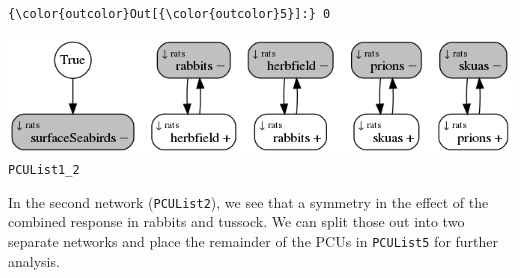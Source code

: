 \documentclass[11pt]{article}
\makeatletter
\def\maxwidth{\ifdim\Gin@nat@width>\linewidth\linewidth
    \else\Gin@nat@width\fi}
\let\Oldincludegraphics\includegraphics
\renewcommand{\includegraphics}[1]{\Oldincludegraphics[width=.8\maxwidth]{#1}}
\makeatother
\begin{document}
\begin{Verbatim}[commandchars=\\\{\}]
{\color{outcolor}Out[{\color{outcolor}5}]:} 0
\end{Verbatim}
            
    \includegraphics{PCUList1_2.png} \texttt{PCUList1\_2}

    In the second network (\texttt{PCUList2}), we see that a symmetry in the
effect of the combined response in rabbits and tussock. We can split
those out into two separate networks and place the remainder of the PCUs
in \texttt{PCUList5} for further analysis.
\end{document}
